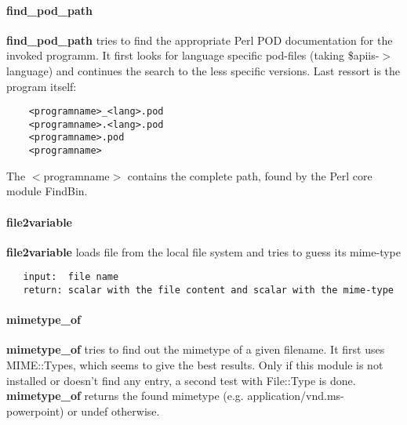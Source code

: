 \paragraph*{find\_pod\_path\label{Apiis::Misc_--_Provides_some_usefull_subroutines_mainly_for_compatibility_reasons_find_pod_path}}


\textbf{find\_pod\_path} tries to find the appropriate Perl POD documentation for the
invoked programm. It first looks for language specific pod-files (taking
\$apiis-$>$language) and continues the search to the less specific versions. Last
ressort is the program itself:

\begin{verbatim}
    <programname>_<lang>.pod
    <programname>.<lang>.pod
    <programname>.pod
    <programname>
\end{verbatim}


The $<$programname$>$ contains the complete path, found by the Perl core module
FindBin.

\paragraph*{file2variable\label{Apiis::Misc_--_Provides_some_usefull_subroutines_mainly_for_compatibility_reasons_file2variable}}


\textbf{file2variable} loads file from the local file system and tries to guess its
mime-type

\begin{verbatim}
   input:  file name
   return: scalar with the file content and scalar with the mime-type
\end{verbatim}
\paragraph*{mimetype\_of\label{Apiis::Misc_--_Provides_some_usefull_subroutines_mainly_for_compatibility_reasons_mimetype_of}}


\textbf{mimetype\_of} tries to find out the mimetype of a given filename. It first
uses MIME::Types, which seems to give the best results. Only if this module is
not installed or doesn't find any entry, a second test with File::Type is
done. \textbf{mimetype\_of} returns the found mimetype (e.g.
application/vnd.ms-powerpoint) or undef otherwise.

